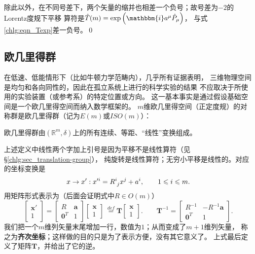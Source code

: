 除此以外，在不同号差下，两个矢量的缩并也相差一个负号；故号差为$-2$的Lorentz度规下平移
算符是$\hat{T}(m) = \exp\left(\mathbbm{i} a^\mu \hat{P}_\mu  \right) $，
与式\eqref{chlg:eqn_Texp}差一负号。\qed



\subsection{欧几里得群}\label{chlg:sec_Euclidean-group}
在低速、低能情形下（比如牛顿力学范畴内），几乎所有证据表明，
三维物理空间是均匀和各向同性的，因此在孤立系统上进行的科学实验的结果
不应取决于所使用的实验装置（或参考系）的特定位置或方向。
这一基本事实是通过假设基础空间是一个欧几里得空间而纳入数学框架的。
$m$维欧几里得空间（正定度规）的对称群是欧几里得群（记为$E(m)$或$ISO(m)$）：
\begin{definition}
    欧几里得群由$(\mathbb{R}^m,\delta)$上的所有连续、等距、“线性”变换组成。
\end{definition}
上述定义中线性两个字加上引号是因为平移不是线性算符（见\S\ref{chlg:sec_translation-group}），
纯旋转是线性算符；无穷小平移是线性的。对应的坐标变换是
\begin{equation}\label{chlg:eqn_trans-rot}
    x\to x' : x'^{i} = R^i_{\hphantom{i} j}x^j + a^i ,\qquad  1 \leqslant i \leqslant m .
\end{equation}
用矩阵形式表示为（后面会证明式中$R\in O(m)$）
\begin{equation}\label{chlg:eqn_Em-max}
    \begin{bmatrix}  \boldsymbol{x}' \\ 1 \end{bmatrix} =
    \begin{bmatrix}  R & \boldsymbol{a} \\ \boldsymbol{0}^T & 1  \end{bmatrix}
    \begin{bmatrix}  \boldsymbol{x} \\ 1 \end{bmatrix} 
    \  \overset{def}{=} \boldsymbol{T} \begin{bmatrix}  \boldsymbol{x} \\ 1 \end{bmatrix} .
    \qquad \boldsymbol{T}^{-1} = 
    \begin{bmatrix}    R^{-1} & -R^{-1} \boldsymbol{a} \\ \boldsymbol{0}^T & 1    \end{bmatrix} .
\end{equation}
我们把一个$m$维列矢量末尾增加一行，数值为$1$；从而变成了$m+1$维列矢量，
称之为\textbf{齐次坐标}；这样做的目的只是为了表示方便，没有其它意义了。
上式最后定义了矩阵$\boldsymbol{T}$，并给出了它的逆。

